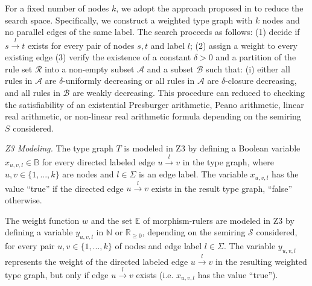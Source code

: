 For a fixed number of nodes $k$, we adopt the approach proposed in \cite{bruggink2015proving, bruggink2014termination,zantema2014termination} to reduce the search space. Specifically, we construct a weighted type graph with
$k$ nodes and no parallel edges of the same label.
The search proceeds as follows: 
(1) decide if $s \overset{l}{\to} t$ exists for every pair of nodes \( s, t\) and label \( l\); (2) assign a weight to every existing edge
(3)
verify the existence of a constant $\delta >0$ and a partition of the rule set $\mathcal{R}$ into a non-empty subset $\mathcal{A}$ and a subset $\mathcal{B}$
 such that: (i) either all rules in $\mathcal{A}$ are $\delta$-uniformly decreasing or all rules in $\mathcal{A}$ are $\delta$-closure decreasing, and all rules in $\mathcal{B}$ are weakly decreasing.
This procedure can reduced to checking the satisfiability of an existential Presburger arithmetic, Peano arithmetic, linear real arithmetic, or non-linear real arithmetic formula depending on the semiring $S$ considered.
  
\emph{Z3 Modeling.} 
The type graph $T$ is modeled in Z3 by defining a Boolean variable $x_{u,v,l} \in \mathbb{B}$ for every directed labeled edge $u\overset{l}{\to} v$ in the type graph, where $u,v\in\{1,...,k\}$ are nodes and $l \in \Sigma$ is an edge label. The variable $x_{u,v,l}$ has the value \enquote{true} if the directed edge $u\overset{l}{\to} v$ exists in the result type graph, \enquote{false} otherwise.

The weight function $w$ and the set $\mathbb{E}$ of morphism-rulers are modeled in Z3 by defining a variable $y_{u,v,l}$ in $\mathbb{N}$ or $\mathbb{R}_{\geq 0}$, depending on the semiring $\mathcal{S}$ considered,
 for every pair $u,v\in\{1,...,k\}$ of nodes and edge label $l \in \Sigma$. 
The variable $y_{u,v,l}$ represents the weight of the directed labeled edge $u\overset{l}{\to} v$ in the resulting weighted type graph, but only if edge $u\overset{l}{\to} v$ exists (i.e. $x_{u,v,l}$ has the value \enquote{true}).

